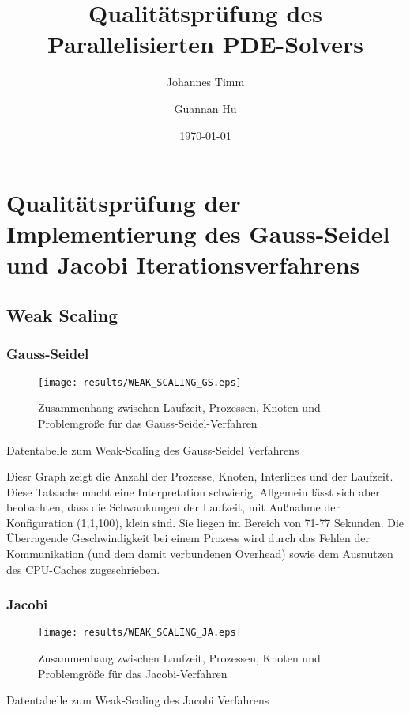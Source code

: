 \documentclass[a4paper,12pt]{scrartcl}
\title{Qualitätsprüfung des Parallelisierten PDE-Solvers}
\author{Johannes Timm \and Guannan Hu}
\date{\today}
\begin{document}
\maketitle
\notag

\section{Qualitätsprüfung der Implementierung des Gauss-Seidel und Jacobi Iterationsverfahrens}
\subsection{Weak Scaling}
\subsubsection{Gauss-Seidel}
\begin{figure}[hr!]
 \texttt{[image: results/WEAK\_SCALING\_GS.eps]}
 \caption{Zusammenhang zwischen Laufzeit, Prozessen, Knoten und Problemgröße für das Gauss-Seidel-Verfahren}
\end{figure}
\begin{table}[hl!]

\caption{Datentabelle zum Weak-Scaling des Gauss-Seidel Verfahrens}
\end{table}


Diesr Graph zeigt die Anzahl der Prozesse, Knoten, Interlines und der 
Laufzeit. Diese Tatsache macht eine Interpretation schwierig. 
Allgemein lässt sich aber beobachten, dass die Schwankungen der Laufzeit, mit Außnahme der Konfiguration (1,1,100), klein sind.
Sie liegen im Bereich von 71-77 Sekunden. Die Überragende Geschwindigkeit bei einem Prozess wird durch das Fehlen der Kommunikation (und dem damit verbundenen Overhead) sowie dem Ausnutzen des CPU-Caches zugeschrieben.
\subsubsection{Jacobi}
\begin{figure}[hr!]
\texttt{[image: results/WEAK\_SCALING\_JA.eps]}
 \caption{Zusammenhang zwischen Laufzeit, Prozessen, Knoten und Problemgröße für das Jacobi-Verfahren}
\end{figure}
\begin{table}[hl!]

\caption{Datentabelle zum Weak-Scaling des Jacobi Verfahrens}
\end{table}
\end{document}
